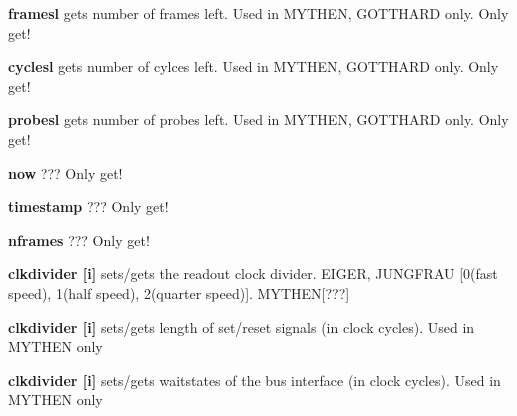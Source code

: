 \begin{DoxyItemize}
\item {\bfseries framesl} gets number of frames left. Used in MYTHEN, GOTTHARD only. Only get!
\end{DoxyItemize}


\begin{DoxyItemize}
\item {\bfseries cyclesl} gets number of cylces left. Used in MYTHEN, GOTTHARD only. Only get!
\end{DoxyItemize}


\begin{DoxyItemize}
\item {\bfseries probesl} gets number of probes left. Used in MYTHEN, GOTTHARD only. Only get!
\end{DoxyItemize}


\begin{DoxyItemize}
\item {\bfseries now} ??? Only get!
\end{DoxyItemize}


\begin{DoxyItemize}
\item {\bfseries timestamp} ??? Only get!
\end{DoxyItemize}


\begin{DoxyItemize}
\item {\bfseries nframes} ??? Only get!
\end{DoxyItemize}


\begin{DoxyItemize}
\item {\bfseries clkdivider \mbox{[}i\mbox{]}} sets/gets the readout clock divider. EIGER, JUNGFRAU \mbox{[}0(fast speed), 1(half speed), 2(quarter speed)\mbox{]}. MYTHEN\mbox{[}???\mbox{]}
\end{DoxyItemize}


\begin{DoxyItemize}
\item {\bfseries clkdivider \mbox{[}i\mbox{]}} sets/gets length of set/reset signals (in clock cycles). Used in MYTHEN only
\end{DoxyItemize}


\begin{DoxyItemize}
\item {\bfseries clkdivider \mbox{[}i\mbox{]}} sets/gets waitstates of the bus interface (in clock cycles). Used in MYTHEN only
\end{DoxyItemize}


